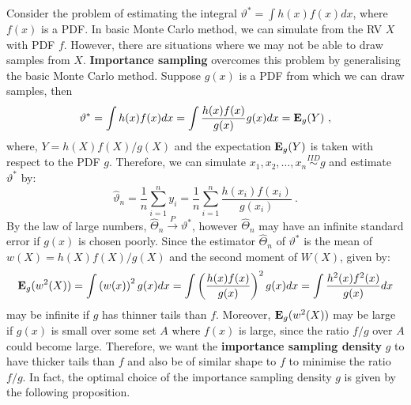 Consider the problem of estimating the integral $\vartheta^* = \int h(x) f(x) dx$, where $f(x)$ is a PDF.  In basic Monte Carlo method, we can simulate from the RV $X$ with PDF $f$.  However, there are situations where we may not be able to draw samples from $X$.  {\bf Importance sampling} overcomes this problem by generalising the basic Monte Carlo method.   Suppose $g(x)$ is a PDF from which we can draw samples, then
\[
\vartheta^* = \int h(x) f(x) dx = \int \frac{h(x) f(x)}{g(x)} g(x) dx = \mathbf{E}_{g}(Y) \ ,
\]
where, $Y=h(X)f(X)/g(X)$ and the expectation $\mathbf{E}_g(Y)$ is taken with respect to the PDF $g$.  Therefore, we can simulate $x_1,x_2,\ldots,x_n \overset{IID}{\sim} g$ and estimate $\vartheta^*$ by:
\[
\widehat{\vartheta}_n = \frac{1}{n} \sum_{i=1}^n y_i =  \frac{1}{n} \sum_{i=1}^n \frac{h(x_i) f(x_i)}{g(x_i)} \ .
\]
By the law of large numbers, $\widehat{\varTheta}_n \overset{P}{\to} \vartheta^*$, however $\widehat{\varTheta}_n$ may have an infinite standard error if $g(x)$ is chosen poorly.  Since the estimator $\widehat{\varTheta}_n$ of $\vartheta^*$ is the mean of $w(X) = h(X)f(X)/g(X)$ and the second moment of $W(X)$, given by:
\[
\mathbf{E}_g(w^2(X)) = \int \left(w(x)\right)^2 g(x) dx = \int \left( \frac{h(x) f(x)}{g(x)} \right)^2 g(x) dx = \int \frac{h^2(x) f^2(x)}{g(x)} dx
\]
may be infinite if $g$ has thinner tails than $f$.  Moreover, $\mathbf{E}_g(w^2(X))$ may be large if $g(x)$ is small over some set $A$ where $f(x)$ is large, since the ratio $f/g$ over $A$ could become large.  Therefore, we want the {\bf importance sampling density} $g$ to have thicker tails than $f$ and also be of similar shape to $f$ to minimise the ratio $f/g$.  In fact, the optimal choice of the importance sampling density $g$ is given by the following proposition.

